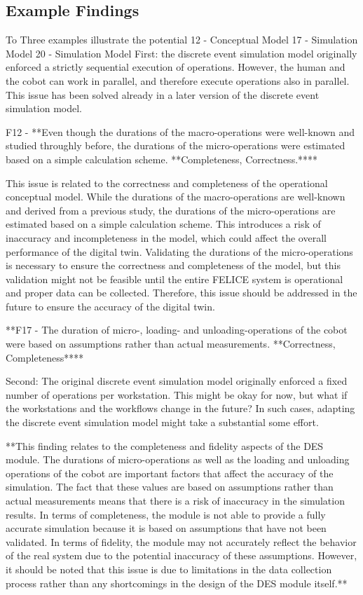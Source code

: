 \documentclass{llncs}
\begin{document}
    \subsection{Example Findings}

    To Three examples illustrate the potential 
    12 - Conceptual Model
    17 - Simulation Model
    20 - Simulation Model
    First: the discrete event simulation model originally enforced a strictly sequential execution of operations.
    However, the human and the cobot can work in parallel, and therefore execute operations also in parallel.
    This issue has been solved already in a later version of the discrete event simulation model.

    F12 - **Even though the durations of the macro-operations were well-known and studied throughly before, the durations of the micro-operations were estimated based on a simple calculation scheme. **Completeness, Correctness.****

    This issue is related to the correctness and completeness of the operational conceptual model. While the durations of the macro-operations are well-known and derived from a previous study, the durations of the micro-operations are estimated based on a simple calculation scheme. This introduces a risk of inaccuracy and incompleteness in the model, which could affect the overall performance of the digital twin. Validating the durations of the micro-operations is necessary to ensure the correctness and completeness of the model, but this validation might not be feasible until the entire
    FELICE system is operational and proper data can be collected. Therefore, this issue should be addressed in the future to ensure the accuracy of the digital twin.


    **F17 - The duration of micro-, loading- and unloading-operations of the cobot were based on assumptions rather than actual measurements.
    **Correctness, Completeness****

    Second: The original discrete event simulation model originally enforced a fixed number of operations per workstation.
    This might be okay for now, but what if the workstations and the workflows change in the future?
    In such cases, adapting the discrete event simulation model might take a substantial some effort.

    **This finding relates to the completeness and fidelity aspects of the DES module. The durations of micro-operations as well as the loading 
    and unloading operations of the cobot are important factors that affect the accuracy of the simulation. The fact that these values are based 
    on assumptions rather than actual measurements means that there is a risk of inaccuracy in the simulation results. In terms of completeness, 
    the module is not able to provide a fully accurate simulation because it is based on assumptions that have not been validated. 
    In terms of fidelity, the module may not accurately reflect the behavior of the real system due to the potential inaccuracy of these assumptions.
    However, it should be noted that this issue is due to limitations in the data collection process rather than any shortcomings in the design of the DES module itself.**
\end{document}
